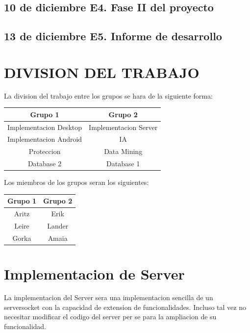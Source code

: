 \documentclass{article}
\theoremstyle{definition}
\begin{document}
\subsection{10 de diciembre	E4. Fase II del proyecto}
\subsection{13 de diciembre	E5. Informe de desarrollo}

\section{DIVISION DEL TRABAJO}

La division del trabajo entre los grupos se hara de la siguiente forma:

\begin{center}
\begin{tabular}{|c|c|}
    \hline Grupo 1 & Grupo 2 \\
    \hline Implementacion Desktop & Implementacion Server \\
    Implementacion Android & IA \\
    Proteccion & Data Mining \\
    Database 2 & Database 1 \\
    \hline
\end{tabular}
\end{center}\smallskip

Los miembros de los grupos seran los siguientes:

\begin{center}
\begin{tabular}{|c|c|}
    \hline
    Grupo 1  & Grupo 2 \\
    \hline
    Aritz & Erik \\
    Leire & Lander \\
    Gorka & Amaia \\
    \hline
\end{tabular}
\end{center}




\section{Implementacion de Server}


La implementacion del Server sera una implementacion sencilla de un serversocket con la capacidad de extension de funcionalidades. Incluso tal vez no necesitar modificar el codigo del server per se para la ampliacion de su funcionalidad. 
\end{document}
